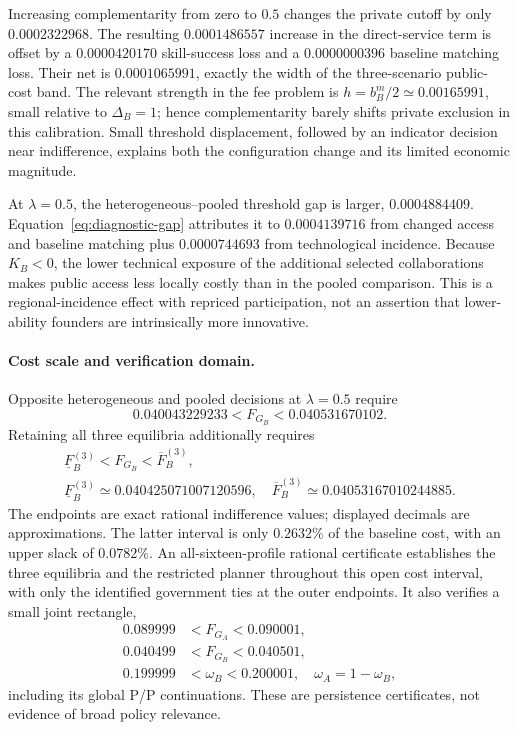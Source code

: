 \documentclass[11pt]{article}
\begin{document}
Increasing complementarity from zero to $0.5$ changes the private cutoff by only $0.0002322968$.
The resulting $0.0001486557$ increase in the direct-service term is offset by a $0.0000420170$ skill-success loss and a $0.0000000396$ baseline matching loss.
Their net is $0.0001065991$, exactly the width of the three-scenario public-cost band.
The relevant strength in the fee problem is $h=b_B^m/2\simeq0.00165991$, small relative to $\Delta_B=1$; hence complementarity barely shifts private exclusion in this calibration.
Small threshold displacement, followed by an indicator decision near indifference, explains both the configuration change and its limited economic magnitude.

At $\lambda=0.5$, the heterogeneous--pooled threshold gap is larger, $0.0004884409$.
Equation~\eqref{eq:diagnostic-gap} attributes it to $0.0004139716$ from changed access and baseline matching plus $0.0000744693$ from technological incidence.
Because $K_B<0$, the lower technical exposure of the additional selected collaborations makes public access less locally costly than in the pooled comparison.
This is a regional-incidence effect with repriced participation, not an assertion that lower-ability founders are intrinsically more innovative.

\paragraph{Cost scale and verification domain.}
Opposite heterogeneous and pooled decisions at $\lambda=0.5$ require
\begin{equation}
 0.040043229233<F_{G_B}<0.040531670102.
 \label{eq:fragility}
\end{equation}
Retaining all three equilibria additionally requires
\begin{equation}
 \begin{split}
 \underline F_B^{(3)}<F_{G_B}<\overline F_B^{(3)},\qquad\\
 \underline F_B^{(3)}\simeq0.040425071007120596,\quad
 \overline F_B^{(3)}\simeq0.04053167010244885.
 \end{split}\label{eq:threeway-open-cost}
\end{equation}
The endpoints are exact rational indifference values; displayed decimals are approximations.
The latter interval is only $0.2632\%$ of the baseline cost, with an upper slack of $0.0782\%$.
An all-sixteen-profile rational certificate establishes the three equilibria and the restricted planner throughout this open cost interval, with only the identified government ties at the outer endpoints.
It also verifies a small joint rectangle,
\begin{equation}
 \begin{split}
 0.089999&<F_{G_A}<0.090001,\\
 0.040499&<F_{G_B}<0.040501,\\
 0.199999&<\omega_B<0.200001,\quad\omega_A=1-\omega_B,
 \end{split}\label{eq:threeway-3d-box}
\end{equation}
including its global P/P continuations.
These are persistence certificates, not evidence of broad policy relevance.
\end{document}

